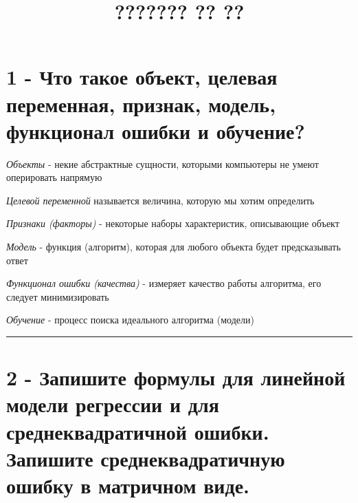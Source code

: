 \documentclass[11pt]{article}
\title{??????? ?? ??}
\begin{document}
    
    
    \maketitle
    
    

    
    \section{1 - Что такое объект, целевая переменная, признак, модель,
функционал ошибки и
обучение?}\label{ux447ux442ux43e-ux442ux430ux43aux43eux435-ux43eux431ux44aux435ux43aux442-ux446ux435ux43bux435ux432ux430ux44f-ux43fux435ux440ux435ux43cux435ux43dux43dux430ux44f-ux43fux440ux438ux437ux43dux430ux43a-ux43cux43eux434ux435ux43bux44c-ux444ux443ux43dux43aux446ux438ux43eux43dux430ux43b-ux43eux448ux438ux431ux43aux438-ux438-ux43eux431ux443ux447ux435ux43dux438ux435}

\emph{Объекты} - некие абстрактные сущности, которыми компьютеры не
умеют оперировать напрямую

\emph{Целевой переменной} называется величина, которую мы хотим
определить

\emph{Признаки (факторы)} - некоторые наборы характеристик, описывающие
объект

\emph{Модель} - функция (алгоритм), которая для любого объекта будет
предсказывать ответ

\emph{Функционал ошибки (качества)} - измеряет качество работы
алгоритма, его следует минимизировать

\emph{Обучение} - процесс поиска идеального алгоритма (модели)

    \begin{center}\rule{0.5\linewidth}{\linethickness}\end{center}

    \section{2 - Запишите формулы для линейной модели регрессии и для
среднеквадратичной ошибки. Запишите среднеквадратичную ошибку в
матричном
виде.}\label{ux437ux430ux43fux438ux448ux438ux442ux435-ux444ux43eux440ux43cux443ux43bux44b-ux434ux43bux44f-ux43bux438ux43dux435ux439ux43dux43eux439-ux43cux43eux434ux435ux43bux438-ux440ux435ux433ux440ux435ux441ux441ux438ux438-ux438-ux434ux43bux44f-ux441ux440ux435ux434ux43dux435ux43aux432ux430ux434ux440ux430ux442ux438ux447ux43dux43eux439-ux43eux448ux438ux431ux43aux438.-ux437ux430ux43fux438ux448ux438ux442ux435-ux441ux440ux435ux434ux43dux435ux43aux432ux430ux434ux440ux430ux442ux438ux447ux43dux443ux44e-ux43eux448ux438ux431ux43aux443-ux432-ux43cux430ux442ux440ux438ux447ux43dux43eux43c-ux432ux438ux434ux435.}
\end{document}
